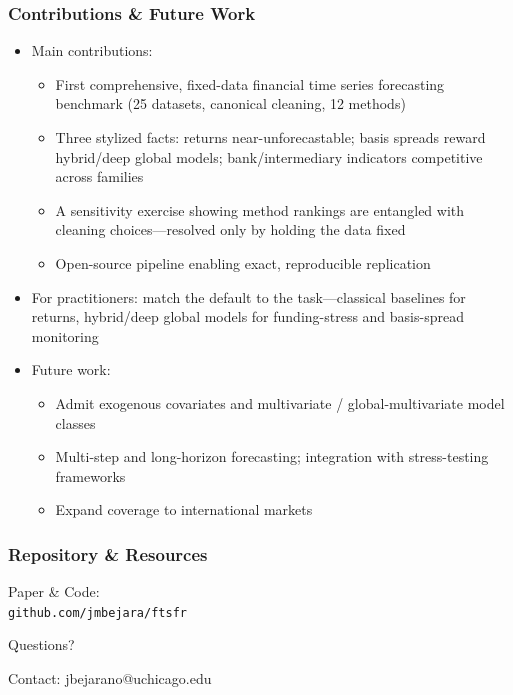 \documentclass[ignorenonframetext, 9pt]{beamer}
\begin{document}
\begin{frame}
  \frametitle{Contributions \& Future Work}
  \begin{itemize}
  \item \alert{Main contributions:}
  \begin{itemize}
    \item First comprehensive, \alert{fixed-data} financial time series forecasting benchmark (25 datasets, canonical cleaning, 12 methods)
    \item Three stylized facts: returns near-unforecastable; basis spreads reward hybrid/deep global models; bank/intermediary indicators competitive across families
    \item A sensitivity exercise showing method rankings are \alert{entangled with cleaning choices}---resolved only by holding the data fixed
    \item Open-source pipeline enabling exact, reproducible replication
  \end{itemize}
  \vspace{0.3cm}
  \item \alert{For practitioners:} match the default to the task---classical baselines for returns, hybrid/deep global models for funding-stress and basis-spread monitoring
  \vspace{0.3cm}
  \item \alert{Future work:}
  \begin{itemize}
    \item Admit exogenous covariates and multivariate / global-multivariate model classes
    \item Multi-step and long-horizon forecasting; integration with stress-testing frameworks
    \item Expand coverage to international markets
  \end{itemize}
  \end{itemize}
\end{frame}

\begin{frame}
    \frametitle{Repository \& Resources}
    \centering
    \vspace{1cm}
    \Large
    \alert{Paper \& Code:} \\
    \texttt{github.com/jmbejara/ftsfr}
    \vspace{1cm}

    \alert{Questions?}
    \vspace{0.5cm}

    \normalsize
  Contact: jbejarano@uchicago.edu
  \end{frame}
\end{document}
